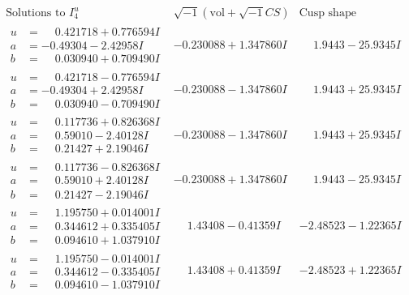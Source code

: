 \documentclass[1p]{elsarticle_modified}
\theoremstyle{definition}
\newcommand{\I}{\sqrt{-1}}
\begin{document}
$$\begin{array}{c|c|c}  
\text{Solutions to }I^u_{4}& \I (\text{vol} + \sqrt{-1}CS) & \text{Cusp shape}\\
 \hline 
\begin{aligned}
u &= \phantom{-}0.421718 + 0.776594 I \\
a &= -0.49304 - 2.42958 I \\
b &= \phantom{-}0.030940 + 0.709490 I\end{aligned}
 & -0.230088 + 1.347860 I & \phantom{-}1.9443 - 25.9345 I \\ \hline\begin{aligned}
u &= \phantom{-}0.421718 - 0.776594 I \\
a &= -0.49304 + 2.42958 I \\
b &= \phantom{-}0.030940 - 0.709490 I\end{aligned}
 & -0.230088 - 1.347860 I & \phantom{-}1.9443 + 25.9345 I \\ \hline\begin{aligned}
u &= \phantom{-}0.117736 + 0.826368 I \\
a &= \phantom{-}0.59010 - 2.40128 I \\
b &= \phantom{-}0.21427 + 2.19046 I\end{aligned}
 & -0.230088 - 1.347860 I & \phantom{-}1.9443 + 25.9345 I \\ \hline\begin{aligned}
u &= \phantom{-}0.117736 - 0.826368 I \\
a &= \phantom{-}0.59010 + 2.40128 I \\
b &= \phantom{-}0.21427 - 2.19046 I\end{aligned}
 & -0.230088 + 1.347860 I & \phantom{-}1.9443 - 25.9345 I \\ \hline\begin{aligned}
u &= \phantom{-}1.195750 + 0.014001 I \\
a &= \phantom{-}0.344612 + 0.335405 I \\
b &= \phantom{-}0.094610 + 1.037910 I\end{aligned}
 & \phantom{-}1.43408 - 0.41359 I & -2.48523 - 1.22365 I \\ \hline\begin{aligned}
u &= \phantom{-}1.195750 - 0.014001 I \\
a &= \phantom{-}0.344612 - 0.335405 I \\
b &= \phantom{-}0.094610 - 1.037910 I\end{aligned}
 & \phantom{-}1.43408 + 0.41359 I & -2.48523 + 1.22365 I \\ \hline\begin{aligned}

\end{aligned}
\end{array}$$
\end{document}
